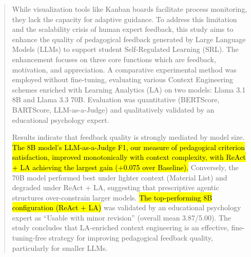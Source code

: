 \documentclass[conference,a4paper]{IEEEtran}
\begin{document}
\begin{abstract}

While visualization tools like Kanban boards facilitate process 
monitoring, they lack the capacity for adaptive guidance. To address 
this limitation and the scalability crisis of human expert feedback, 
this study aims to enhance the quality of pedagogical feedback generated 
by Large Language Models (LLMs) to support student Self-Regulated Learning 
(SRL). The enhancement focuses on three core functions which are feedback, 
motivation, and appreciation. A comparative experimental method was 
employed without fine-tuning, evaluating various Context Engineering 
schemes enriched with Learning Analytics (LA) on two models: Llama 3.1 8B 
and Llama 3.3 70B. Evaluation was quantitative (BERTScore, BARTScore, 
LLM-as-a-Judge) and qualitatively validated by an educational psychology
expert.


Results indicate that feedback quality is strongly mediated by model
size. \hl{The 8B model's LLM-as-a-Judge F1, our measure of pedagogical
criterion satisfaction, improved monotonically with context
complexity, with ReAct + LA achieving the largest gain (+0.075 over
Baseline).}
Conversely,
the 70B model performed best under lighter context (Material List) and
degraded under ReAct + LA, suggesting that prescriptive agentic
structures over-constrain larger models. \hl{The top-performing 8B
configuration (ReAct + LA)} was validated by an
educational psychology expert as “Usable with minor revision”
(overall mean 3.87/5.00). The study concludes that LA-enriched
context engineering is an effective, fine-tuning-free strategy for
improving pedagogical feedback quality, particularly for smaller LLMs.


\end{abstract}
\end{document}
